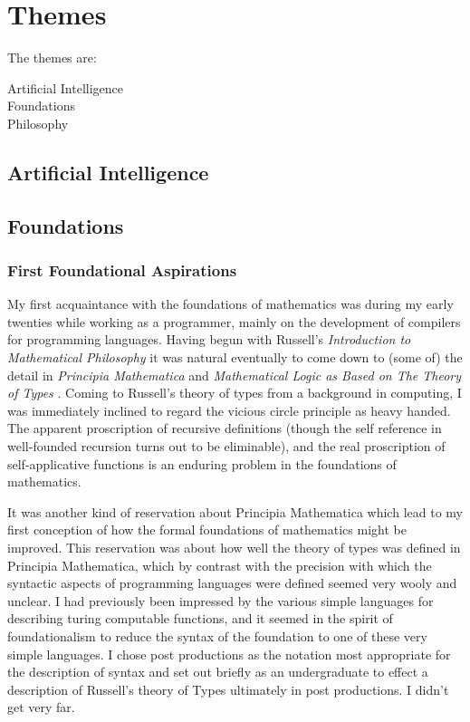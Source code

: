 \documentclass[10pt,titlepage]{book}
\begin{document}
\chapter{Themes}

The themes are:
\begin{description}
\item[Artificial Intelligence]
\item[Foundations]
\item[Philosophy]
\end{description}

\section{Artificial Intelligence}



\section{Foundations}

\subsection{First Foundational Aspirations}

My first acquaintance with the foundations of mathematics was during my early twenties while working as a programmer, mainly on the development of compilers for programming languages.
Having begun with Russell's \emph{Introduction to Mathematical Philosophy} \cite{russell10} it was natural eventually to come down to (some of) the detail in \emph{Principia Mathematica} \cite{russell10} and \emph{Mathematical Logic as Based on The Theory of Types} \cite{russell1908}.
Coming to Russell's theory of types from a background in computing, I was immediately inclined to regard the vicious circle principle as heavy handed.
The apparent proscription of recursive definitions (though the self reference in well-founded recursion turns out to be eliminable), and the real proscription of self-applicative functions is an enduring problem in the foundations of mathematics.

It was another kind of reservation about Principia Mathematica which lead to my first conception of how the formal foundations of mathematics might be improved.
This reservation was about how well the theory of types was defined in Principia Mathematica, which by contrast with the precision with which the syntactic aspects of programming languages were defined seemed very wooly and unclear.
I had previously been impressed by the various simple languages for describing turing computable functions, and it seemed in the spirit of foundationalism to reduce the syntax of the foundation to one of these very simple languages.
I chose post productions as the notation most appropriate for the description of syntax and set out briefly as an undergraduate to effect a description of Russell's theory of Types ultimately in post productions.
I didn't get very far.
\end{document}
